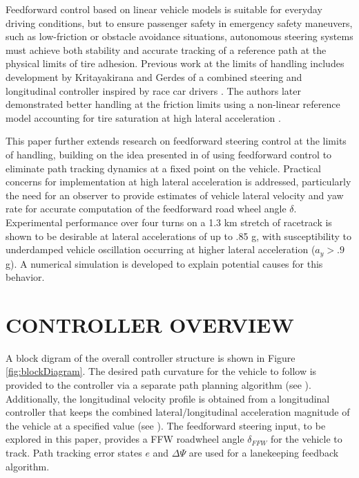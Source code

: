 \documentclass[twocolumn,10pt]{asme2e}
\begin{document}
Feedforward control based on linear vehicle models is suitable for everyday driving conditions, but to ensure passenger safety in emergency safety maneuvers, such as low-friction or obstacle avoidance situations, autonomous steering systems must achieve both stability and accurate tracking of a reference path at the physical limits of tire adhesion. Previous work at the limits of handling
includes development by Kritayakirana and Gerdes of a combined steering and longitudinal controller inspired by race car drivers \cite{mickgeneral}. The authors later demonstrated better
handling at the friction limits using a non-linear reference model accounting for tire saturation at high lateral acceleration \cite{mickcop}. 

This paper further extends research on feedforward steering control at the limits of handling, building on the idea 
presented in \cite{mickcop} of using feedforward control to eliminate path tracking dynamics at a fixed point on the vehicle. Practical concerns for implementation at high lateral acceleration is addressed, particularly the need for an observer to provide estimates of vehicle lateral velocity and yaw rate
for accurate computation of the feedforward road wheel angle $\delta$. Experimental performance over four turns on a 1.3 km stretch of racetrack is shown to be desirable at lateral accelerations of up to .85 g, with susceptibility 
to underdamped vehicle oscillation occurring at higher lateral acceleration ($ a_y> .9$ g). A numerical simulation is developed to explain potential causes for this behavior.


\section{CONTROLLER OVERVIEW} \label{sec:modeling}

A block digram of the overall controller structure is shown in Figure \ref{fig:blockDiagram}. The desired path curvature 
for the vehicle to follow is provided to the controller via a separate path planning algorithm 
(see \cite{theodosis}). Additionally, the longitudinal velocity profile is obtained from a longitudinal 
controller that keeps the combined lateral/longitudinal acceleration magnitude of the vehicle at a specified value (see \cite{mickgeneral}). The 
feedforward steering input, to be explored in this paper, provides a FFW roadwheel angle $\delta_{FFW}$ for the vehicle to track. Path tracking error states $e$ and $\Delta\Psi$ are used
for a lanekeeping feedback algorithm. 
\end{document}

